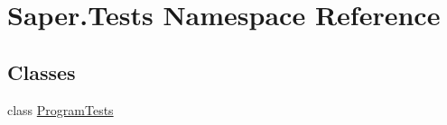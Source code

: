 \hypertarget{namespace_saper_1_1_tests}{}\section{Saper.\+Tests Namespace Reference}
\label{namespace_saper_1_1_tests}
\subsection*{Classes}
\begin{DoxyCompactItemize}
\item 
class \mbox{\hyperlink{class_saper_1_1_tests_1_1_program_tests}{Program\+Tests}}
\end{DoxyCompactItemize}
